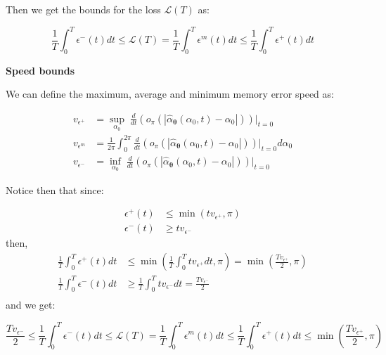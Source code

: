 \documentclass{article} %
\theoremstyle{definition}
\theoremstyle{remark}
\begin{document}
Then we get the bounds for the loss \(\mathcal{L}(T)\) as:

\begin{equation}
    \frac{1}{T} \int_0^{T} \epsilon^-(t)dt \leq \mathcal{L}(T) = \frac{1}{T} \int_0^{T} \epsilon^{m}(t) dt \leq  \frac{1}{T} \int_0^{T} \epsilon^+(t) dt
\end{equation}


\textbf{Speed bounds}

We can define the maximum, average and minimum memory error speed as:

\begin{equation}
\begin{split}
    v_{\epsilon^+} &= \sup_{\alpha_0} \; \frac{d}{dt} (o_\pi \left( \left| \hat{\alpha}_{\boldsymbol{\theta}}(\alpha_0, t) - \alpha_0  \right| \right)) |_{t = 0}  \\
    v_{\epsilon^m} &= \frac{1}{2 \pi} \int_0^{2 \pi} \frac{d}{dt} (o_\pi \left( \left| \hat{\alpha}_{\boldsymbol{\theta}}(\alpha_0, t) - \alpha_0  \right| \right))|_{t = 0} d\alpha_0 \\
    v_{\epsilon^-} &= \inf_{\alpha_0} \; \frac{d}{dt} (o_\pi \left( \left| \hat{\alpha}_{\boldsymbol{\theta}}(\alpha_0, t) - \alpha_0  \right| \right))|_{t = 0}
\end{split}
\end{equation}

Notice then that since:

\begin{equation}
\begin{split}
    \epsilon^+(t) &\leq \min(t v_{\epsilon^+}, \pi) \\
    \epsilon^-(t) &\geq t v_{\epsilon^-}
\end{split}
\end{equation}
then,
\begin{equation}
\begin{split}
    \frac{1}{T} \int_0^{T} \epsilon^+(t)dt &\leq  \min \left( \frac{1}{T} \int_0^{T} t v_{\epsilon^+} dt, \pi \right) = \min \left( \frac{T v_{\epsilon^+}}{2}, \pi \right) \\
    \frac{1}{T} \int_0^{T} \epsilon^-(t)dt &\geq  \frac{1}{T} \int_0^{T} tv_{\epsilon^-}dt  = \frac{T v_{\epsilon^-}}{2} \\
\end{split}
\end{equation}
and we get:

\begin{equation}
    \frac{T v_{\epsilon^-}}{2} \leq \frac{1}{T} \int_0^{T} \epsilon^-(t)dt \leq \mathcal{L}(T) = \frac{1}{T} \int_0^{T} \epsilon^{m}(t) dt \leq  \frac{1}{T} \int_0^{T} \epsilon^+(t) dt \leq \min \left( \frac{T v_{\epsilon^+}}{2}, \pi \right)
\end{equation}
\end{document}
